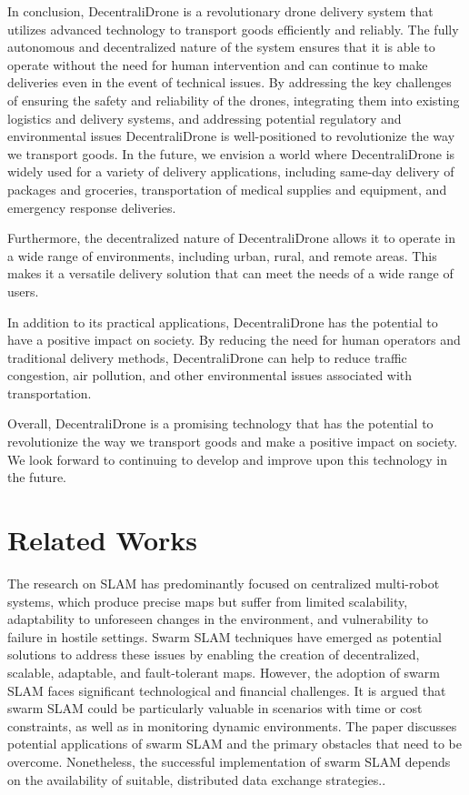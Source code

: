 \documentclass[conference]{IEEEtran}
\begin{document}
In conclusion, DecentraliDrone is a revolutionary drone delivery system that utilizes advanced technology to transport goods efficiently and reliably. The fully autonomous and decentralized nature of the system ensures that it is able to operate without the need for human intervention and can continue to make deliveries even in the event of technical issues. By addressing the key challenges of ensuring the safety and reliability of the drones, integrating them into existing logistics and delivery systems, and addressing potential regulatory and environmental issues DecentraliDrone is well-positioned to revolutionize the way we transport goods. In the future, we envision a world where DecentraliDrone is widely used for a variety of delivery applications, including same-day delivery of packages and groceries, transportation of medical supplies and equipment, and emergency response deliveries.

Furthermore, the decentralized nature of DecentraliDrone allows it to operate in a wide range of environments, including urban, rural, and remote areas. This makes it a versatile delivery solution that can meet the needs of a wide range of users.

In addition to its practical applications, DecentraliDrone has the potential to have a positive impact on society. By reducing the need for human operators and traditional delivery methods, DecentraliDrone can help to reduce traffic congestion, air pollution, and other environmental issues associated with transportation.

Overall, DecentraliDrone is a promising technology that has the potential to revolutionize the way we transport goods and make a positive impact on society. We look forward to continuing to develop and improve upon this technology in the future.

\section{Related Works}

The research on SLAM has predominantly focused on centralized multi-robot systems, which produce precise maps but suffer from limited scalability, adaptability to unforeseen changes in the environment, and vulnerability to failure in hostile settings. Swarm SLAM techniques have emerged as potential solutions to address these issues by enabling the creation of decentralized, scalable, adaptable, and fault-tolerant maps. However, the adoption of swarm SLAM faces significant technological and financial challenges. It is argued that swarm SLAM could be particularly valuable in scenarios with time or cost constraints, as well as in monitoring dynamic environments. The paper discusses potential applications of swarm SLAM and the primary obstacles that need to be overcome. Nonetheless, the successful implementation of swarm SLAM depends on the availability of suitable, distributed data exchange strategies.\cite{li2018review}.
\end{document}
